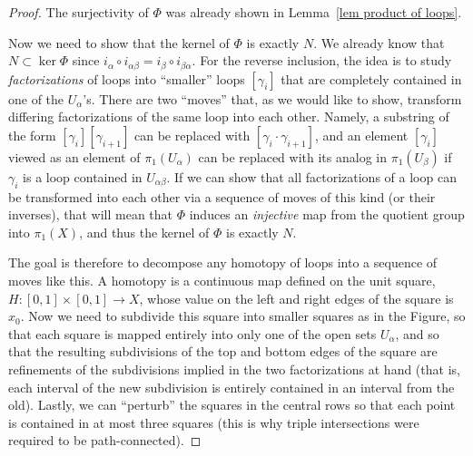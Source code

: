 \begin{proof}
    The surjectivity of $\varPhi$ was already shown in Lemma~\ref{lem product of loops}. 
    
    Now we need to show that the kernel of $\varPhi$ is exactly $N$. We already know that $N\subset \ker \varPhi$ since $i_\alpha\circ i_{\alpha\beta}=i_\beta\circ i_{\beta\alpha}$. For the reverse inclusion, the idea is to study \emph{factorizations} of loops into ``smaller'' loops $[\gamma_i]$ that are completely contained in one of the $U_\alpha$'s. There are two ``moves'' that, as we would like to show, transform differing factorizations of the same loop into each other. Namely, a substring of the form $[\gamma_i][\gamma_{i+1}]$ can be replaced with $[\gamma_i\cdot \gamma_{i+1}]$, and an element $[\gamma_i]$ viewed as an element of $\pi_1(U_\alpha)$ can be replaced with its analog in $\pi_1(U_\beta)$ if $\gamma_i$ is a loop contained in $U_{\alpha\beta}$. If we can show that all factorizations of a loop can be transformed into each other via a sequence of moves of this kind (or their inverses), that will mean that $\varPhi$ induces an \emph{injective} map from the quotient group into $\pi_1(X)$, and thus the kernel of $\varPhi$ is exactly $N$.

    The goal is therefore to decompose any homotopy of loops into a sequence of moves like this. A homotopy is a continuous map defined on the unit square, $H:[0,1]\times[0,1]\to X$, whose value on the left and right edges of the square is $x_0$. Now we need to subdivide this square into smaller squares as in the Figure, so that each square is mapped entirely into only one of the open sets $U_\alpha$, and so that the resulting subdivisions of the top and bottom edges of the square are refinements of the subdivisions implied in the two factorizations at hand (that is, each interval of the new subdivision is entirely contained in an interval from the old). Lastly, we can ``perturb'' the squares in the central rows so that each point is contained in at most three squares (this is why triple intersections were required to be path-connected).


\end{proof}

